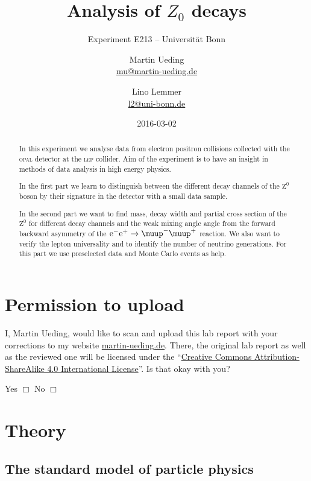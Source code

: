 \documentclass[11pt, english, fleqn, DIV=15, headinclude, BCOR=2cm]{scrreprt}
\title{Analysis of $Z_0$ decays}
\subtitle{Experiment E213 -- Universität Bonn}
\author{%
    Martin Ueding \\
    \small{\href{mailto:mu@martin-ueding.de}{mu@martin-ueding.de}}
    \and
    Lino Lemmer \\
    \small{\href{mailto:l2@uni-bonn.de}{l2@uni-bonn.de}}
}
\date{2016-03-02}
\newcommand\electron{\mathrm e^-}
\newcommand\positron{\mathrm e^+}
\begin{document}
\maketitle

\begin{abstract}
    In this experiment we analyse data from electron positron collisions
    collected with the \textsc{opal} detector at the \textsc{lep} collider.
    Aim of the experiment is to have an insight in methods of data analysis in
    high energy physics.
    
    In the first part we learn to distinguish between the different decay
    channels of the $\mathrm{Z}^0$ boson by their signature in the detector
    with a small data sample.

    In the second part we want to find mass, decay width and partial cross
    section of the $\mathrm{Z}^0$ for different decay channels and the weak
    mixing angle angle from the forward backward asymmetry of the
    $\electron\positron \to \muup^-\muup^+$ reaction. We also want to verify
    the lepton universality and to identify the number of neutrino generations.
    For this part we use preselected data and Monte Carlo events as help.
\end{abstract}

\tableofcontents

\chapter*{Permission to upload}

I, Martin Ueding, would like to scan and upload this lab report with your
corrections to my website \href{http://martin-ueding.de}{martin-ueding.de}.
There, the original lab report as well as the reviewed one will be licensed
under the “\href{http://creativecommons.org/licenses/by-sa/4.0/}{Creative
Commons Attribution-ShareAlike 4.0 International License}”. Is that okay with
you?

Yes $\Box$ \hspace{2cm} No $\Box$

\chapter{Theory}

\section{The standard model of particle physics}
\end{document}
